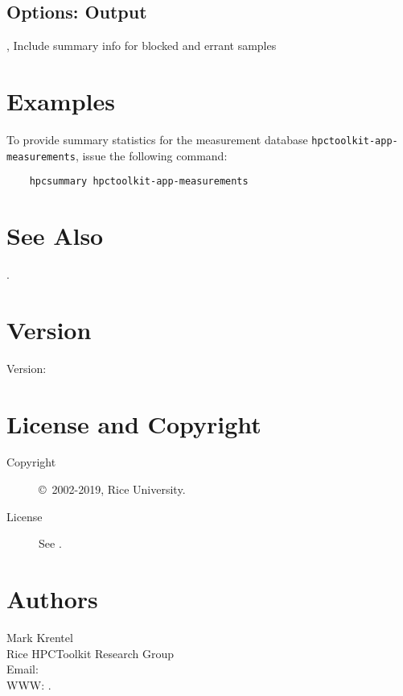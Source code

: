 \documentclass[english]{article}
\begin{document}
\subsection{Options: Output}

\begin{Description}

\item[\Opt{-a}, \Opt{--all}]
Include summary info for blocked and errant samples

\end{Description}


\section{Examples}

To provide summary statistics for the measurement database \texttt{hpctoolkit-app-measurements},
issue the following command:
\begin{verbatim}
    hpcsummary hpctoolkit-app-measurements
\end{verbatim}




\section{See Also}

.

\section{Version}

Version: \Version

\section{License and Copyright}

\begin{description}
\item[Copyright] \copyright\ 2002-2019, Rice University.
\item[License] See .
\end{description}

\section{Authors}

\noindent
Mark Krentel \\
Rice HPCToolkit Research Group \\
Email:  \\
WWW: .

\LatexManEnd
\end{document}

